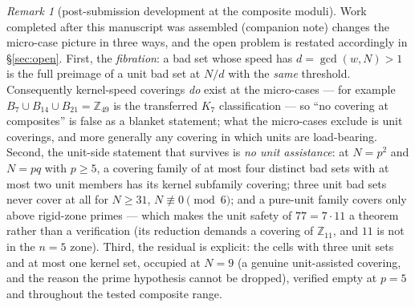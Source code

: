 \documentclass[11pt,a4paper]{article}
\numberwithin{equation}{section}
\theoremstyle{plain}
\theoremstyle{plain}
\theoremstyle{definition}
\theoremstyle{remark}
\newtheorem{remark}[theorem]{Remark}
\newcommand{\Z}{\mathbb{Z}}
\begin{document}
\begin{remark}[post-submission development at the composite moduli]
\label{rem:postcomposite}
Work completed after this manuscript was assembled (companion note) changes
the micro-case picture in three ways, and the open problem is restated
accordingly in \S\ref{sec:open}. First, the \emph{fibration}: a bad set
whose speed has $d=\gcd(w,N)>1$ is the full preimage of a unit bad set at
$N/d$ with the \emph{same} threshold. Consequently kernel-speed coverings
\emph{do} exist at the micro-cases --- for example
$B_7\cup B_{14}\cup B_{21}=\Z_{49}$ is the transferred $K_7$ classification
--- so ``no covering at composites'' is false as a blanket statement; what
the micro-cases exclude is unit coverings, and more generally any covering
in which units are load-bearing. Second, the unit-side statement that
survives is \emph{no unit assistance}: at $N=p^2$ and $N=pq$ with
$p\ge5$, a covering family of at most four distinct bad sets with at most
two unit members has its kernel subfamily covering; three unit bad sets
never cover at all for $N\ge31$, $N\not\equiv0\pmod6$; and a pure-unit
family covers only above rigid-zone primes --- which makes the unit safety
of $77=7\cdot11$ a theorem rather than a verification (its reduction
demands a covering of $\Z_{11}$, and $11$ is not in the $n=5$ zone). Third,
the residual is explicit: the cells with three unit sets and at most one
kernel set, occupied at $N=9$ (a genuine unit-assisted covering, and the
reason the prime hypothesis cannot be dropped), verified empty at $p=5$
and throughout the tested composite range.


\end{remark}
\end{document}
